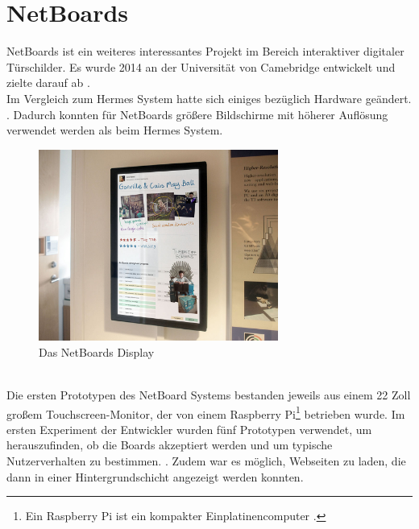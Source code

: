 \section{NetBoards}
NetBoards \cite{wood:2014,netboards:website} ist ein weiteres interessantes Projekt im Bereich interaktiver digitaler Türschilder. Es wurde 2014 an der Universität von Camebridge entwickelt und zielte darauf ab .
\\
Im Vergleich zum Hermes System hatte sich einiges bezüglich Hardware geändert. .
Dadurch konnten für NetBoards größere Bildschirme mit höherer Auflösung  verwendet werden als beim Hermes System.
\begin{figure}[h!]
  \centering
    \includegraphics[width=0.7\textwidth]{./img/netBoards_display.png}
  \caption{Das NetBoards Display \cite{wood:2014}}
  \label{img:netBoardsDisplay}
\end{figure}
\\
Die ersten Prototypen des NetBoard Systems bestanden jeweils aus einem 22 Zoll großem Touchscreen-Monitor, der von einem Raspberry Pi\footnote{Ein Raspberry Pi ist ein kompakter Einplatinencomputer \cite{raspberrypi:website}.} betrieben wurde.
Im ersten Experiment der Entwickler wurden fünf Prototypen verwendet, um herauszufinden, ob die Boards akzeptiert werden und um typische Nutzerverhalten zu bestimmen.
. Zudem war es möglich, Webseiten zu laden, die dann in einer Hintergrundschicht angezeigt werden konnten.
